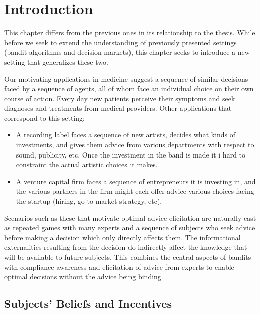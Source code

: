 
\section{Introduction}

This chapter differs from the previous ones in its relationship to the thesis. 
While before we seek to extend the understanding of previously presented settings (bandit algorithms and decision markets), this chapter seeks to introduce a new setting that generalizes these two.


Our motivating applications in medicine suggest a sequence of similar decisions faced by a sequence of agents, all of whom face an individual choice on their own course of action.
Every day new patients perceive their symptoms and seek diagnoses and treatments from medical providers. Other applications that correspond to this setting:

\begin{itemize}
  \item A recording label faces a sequence of new artists, decides what kinds of investments, and gives them advice from various departments with respect to sound, publicity, etc. Once the investment in the band is made it i hard to constraint the actual artistic choices it makes. 
  \item A venture capital firm faces a sequence of entrepreneurs it is investing in, and the various partners in the firm might each offer advice various choices facing the startup (hiring, go to market strategy, etc).
\end{itemize}

Scenarios such as these that motivate optimal advice elicitation are naturally cast as repeated games with many experts and a sequence of subjects who seek advice before making a decision which only directly affects them. The informational externalities resulting from the decision do indirectly affect the knowledge that will be available to future subjects. 
This combines the central aspects of bandits with compliance awareness and elicitation of advice from experts to enable optimal decisions without the advice being binding. 


\subsection{Subjects' Beliefs and Incentives}


